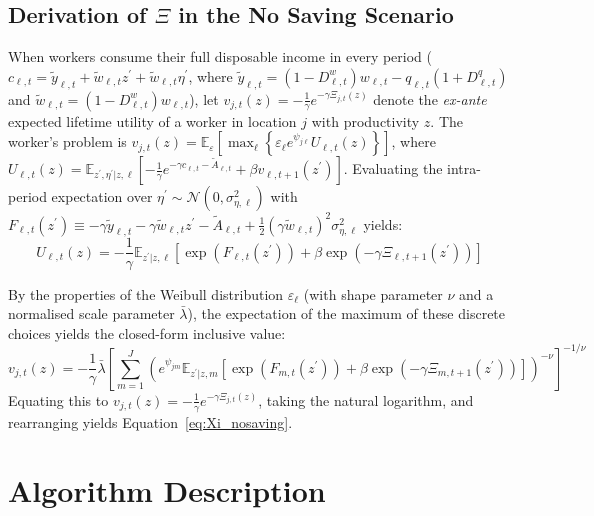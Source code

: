 \documentclass[11pt, a4paper]{article}
\begin{document}
\subsection{Derivation of $\Xi$ in the No Saving Scenario}
\label{sec:appendix_no_saving}
When workers consume their full disposable income in every period ($c_{\ell,t} = \tilde{y}_{\ell,t} + \tilde{w}_{\ell,t}z^\prime + \tilde{w}_{\ell,t}\eta^\prime$, where $\tilde{y}_{\ell,t} = (1 - D^w_{\ell,t})w_{\ell,t} - q_{\ell,t}(1+ D^q_{\ell,t})$ and $\tilde{w}_{\ell,t} = (1 - D^w_{\ell,t})w_{\ell,t}$), let $v_{j,t}(z) = -\frac{1}{\gamma} e^{-\gamma \Xi_{j,t}(z)}$ denote the \textit{ex-ante} expected lifetime utility of a worker in location $j$ with productivity $z$. The worker's problem is $v_{j,t}(z) = \mathbb{E}_{\varepsilon} \left[ \max_{\ell} \left\{ \varepsilon_\ell e^{\psi_{j\ell}} U_{\ell,t}(z) \right\} \right]$, where $U_{\ell,t}(z) = \mathbb{E}_{z^\prime, \eta^\prime | z, \ell} \left[ -\frac{1}{\gamma} e^{-\gamma c_{\ell,t} - \tilde{A}_{\ell,t}} + \beta v_{\ell,t+1}(z^\prime) \right]$. Evaluating the intra-period expectation over $\eta^\prime \sim \mathcal{N}(0, \sigma_{\eta, \ell}^2)$ with $F_{\ell,t}(z^\prime) \equiv -\gamma \tilde{y}_{\ell,t} - \gamma \tilde{w}_{\ell,t} z^\prime - \tilde{A}_{\ell,t} + \frac{1}{2}(\gamma \tilde{w}_{\ell,t})^2 \sigma_{\eta,\ell}^2$ yields:
\begin{equation}
U_{\ell,t}(z) = -\frac{1}{\gamma} \mathbb{E}_{z^\prime | z, \ell} \left[ \exp\left(F_{\ell,t}(z^\prime)\right) + \beta \exp\left(-\gamma \Xi_{\ell,t+1}(z^\prime)\right) \right]
\end{equation}

By the properties of the Weibull distribution $\varepsilon_\ell$ (with shape parameter $\nu$ and a normalised scale parameter $\bar{\lambda}$), the expectation of the maximum of these discrete choices yields the closed-form inclusive value:
\begin{equation}
v_{j,t}(z) = -\frac{1}{\gamma} \bar{\lambda} \left[ \sum_{m=1}^J \left( e^{\psi_{jm}} \mathbb{E}_{z^\prime | z, m} \left[ \exp\left(F_{m,t}(z^\prime)\right) + \beta \exp\left(-\gamma \Xi_{m,t+1}(z^\prime)\right) \right] \right)^{-\nu} \right]^{-1/\nu}
\end{equation}
Equating this to $v_{j,t}(z) = -\frac{1}{\gamma} e^{-\gamma \Xi_{j,t}(z)}$, taking the natural logarithm, and rearranging yields Equation~\eqref{eq:Xi_nosaving}.

\section{Algorithm Description}
\label{app:algorithms}
\end{document}
